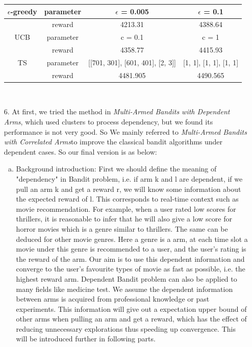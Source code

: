 \documentclass{article}
\begin{document}
\begin{homeworkProblem}
\begin{enumerate}
        \begin{tabular}[t]{|c|c|c|c|}
        \hline
        $\epsilon$-greedy & parameter & $\epsilon$ = 0.005 & $\epsilon$ = 0.1  \\
        \hline
         & reward & 4213.31 & 4388.64  \\
        \hline
        UCB & parameter & c = 0.1 & c = 1  \\
        \hline
         & reward & 4358.77 & 4415.93  \\
        \hline
        TS & parameter & [[701, 301], [601, 401], [2, 3]] & [1, 1], [1, 1], [1, 1]  \\
        \hline
         & reward & 4481.905 & 4490.565  \\
        \hline
        \end{tabular}\\
        
        \item[6.]
        At first, we tried the method in \textsl{Multi-Armed Bandits with Dependent Arms}\cite{ref2}, which used clusters to process dependency, but we found its performance is not very good.
        So We mainly referred to \textsl{Multi-Armed Bandits with Correlated Arms}\cite{ref3}to improve the classical bandit algorithms under dependent cases.
        So our final version is as below:

        \begin{enumerate}[a.]
            \item Background introduction:
            First we should define the meaning of "dependency" in Bandit problem, i.e. if arm k and l are dependent, if we pull an arm k and get a reward r, we will know some information about the expected reward of l. This corresponds to real-time context such as movie recommendation. For example, when a user rated low scores for thrillers, it is reasonable to infer that he will also give a low score for horror movies which is a genre similar to thrillers. The same can be deduced for other movie genres. Here a genre is a arm, at each time slot a movie under this genre is recommended to a user, and the user's rating is the reward of the arm. Our aim is to use this dependent information and converge to the user's favourite types of movie as fast as possible, i.e. the highest reward arm. Dependent Bandit problem can also be applied to many fields like medicine test. We assume the dependent information between arms is acquired from professional knowledge or past experiments. This information will give out a expectation upper bound of other arms when pulling an arm and get a reward, which has the effect of reducing unnecessary explorations thus speeding up convergence. This will be introduced further in following parts.
            

\end{enumerate}
\end{enumerate}
\end{homeworkProblem}
\end{document}
